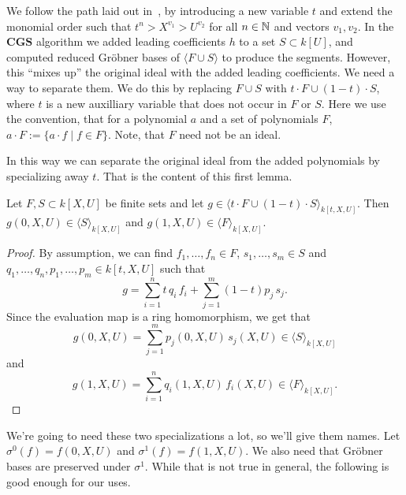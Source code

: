 We follow the path laid out in~\cite{ss_algo}, by introducing a new variable $t$ and extend the monomial order such that $t^{n} > X^{v_{1}} > U^{v_{2}}$ for all $n \in \mathbb{N}$ and vectors $v_{1}, v_{2}$. In the $\mathbf{CGS}$ algorithm we added leading coefficients $h$ to a set $S \subset k[U]$, and computed reduced Gröbner bases of $\langle F \cup S \rangle$ to produce the segments. However, this ``mixes up'' the original ideal with the added leading coefficients. We need a way to separate them. We do this by replacing $F \cup S$ with $t\cdot F \cup (1-t)\cdot S$, where $t$ is a new auxilliary variable that does not occur in $F$ or $S$. Here we use the convention, that for a polynomial $a$ and a set of polynomials $F$, $a\cdot F := \{a \cdot f \mid f \in F\}$. Note, that $F$ need not be an ideal.

In this way we can separate the original ideal from the added polynomials by specializing away $t$. That is the content of this first lemma.

\begin{lemma}\label{lem:seperation}
  Let $F, S \subset k[X, U]$ be finite sets and let $g \in \langle t\cdot F \cup (1-t)\cdot S \rangle_{k[t, X, U]}$. Then $g(0, X, U) \in \langle S \rangle_{k[X, U]}$ and $g(1, X, U) \in \langle F \rangle_{k[X, U]}$.
\end{lemma}
\begin{proof}
  By assumption, we can find $f_{1}, \dots, f_{n} \in F$, $s_{1}, \dots, s_{m} \in S$ and $q_{1}, \dots, q_{n}, p_{1}, \dots, p_{m} \in k[t, X, U]$ such that
  \[g = \sum_{i=1}^{n} t\, q_{i}\, f_{i} + \sum_{j=1}^{m} (1 - t) p_{j}\, s_{j}.\]
  Since the evaluation map is a ring homomorphism, we get that
  \[g(0, X, U) = \sum_{j=1}^{m} p_{j}(0, X, U)\, s_{j}(X, U) \in \langle S \rangle_{k[X, U]}\]
  and
  \[g(1, X, U) = \sum_{i=1}^{n} q_{i}(1, X, U)\, f_{i}(X, U) \in \langle F \rangle_{k[X, U]}.\]
\end{proof}

We're going to need these two specializations a lot, so we'll give them names. Let $\sigma^{0}(f) = f(0, X, U)$ and $\sigma^{1}(f) = f(1, X, U)$. We also need that Gröbner bases are preserved under $\sigma^{1}$. While that is not true in general, the following is good enough for our uses.

